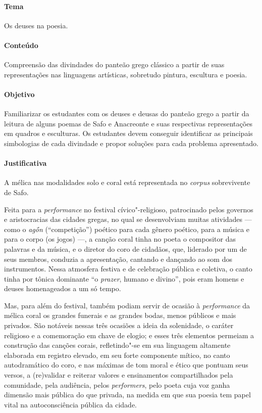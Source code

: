 \documentclass[12pt]{extarticle}
\begin{document}
\paragraph{Tema} Os deuses na poesia.

\paragraph{Conteúdo} Compreensão das divindades do panteão grego clássico a partir
de suas representações nas linguagens artísticas, sobretudo pintura, escultura e poesia.

\paragraph{Objetivo} Familiarizar os estudantes com os deuses e deusas do panteão grego
a partir da leitura de alguns poemas de Safo e Anacreonte e suas respectivas representações
em quadros e esculturas. Os estudantes devem conseguir identificar as principais simbologias
de cada divindade e propor soluções para cada problema apresentado.

\paragraph{Justificativa} A mélica nas modalidades solo e coral está representada 
no \textit{corpus} sobrevivente de Safo.

Feita para a \textit{performance} no festival cívico"-religioso, patrocinado
pelos governos e aristocracias das cidades gregas, no qual se
desenvolviam muitas atividades --- como o \textit{agṓn} (“competição”) poético
para cada gênero poético, para a música e para o corpo (os jogos) \mbox{---,} 
a canção coral tinha no poeta o compositor das palavras e
da música, e o diretor do coro de cidadãos, que, liderado por um de seus
membros, conduzia a apresentação, cantando e dançando ao som dos instrumentos.
Nessa atmosfera festiva e de celebração pública e coletiva, o canto tinha por
tônica dominante “o \textit{prazer}, humano e divino”, pois eram homens e deuses 
homenageados a um só tempo.

Mas, para além do festival, também podiam servir de ocasião à
\textit{performance} da mélica coral os grandes funerais e as grandes bodas,
menos públicos e mais privados. São notáveis nessas três ocasiões a ideia da
solenidade, o caráter religioso e a comemoração em chave de elogio; e esses
três elementos permeiam a construção das canções corais, refletindo"-se
em sua linguagem altamente elaborada em registro elevado, em seu forte
componente mítico, no canto autodramático do coro, e nas máximas de tom moral
e ético que pontuam seus versos, a (re)validar e reiterar valores e
ensinamentos compartilhados pela comunidade, pela audiência, pelos
\textit{performers}, pelo poeta cuja voz ganha dimensão mais
pública do que privada, na medida em que sua poesia tem papel vital na autoconsciência 
pública da cidade.
\end{document}
